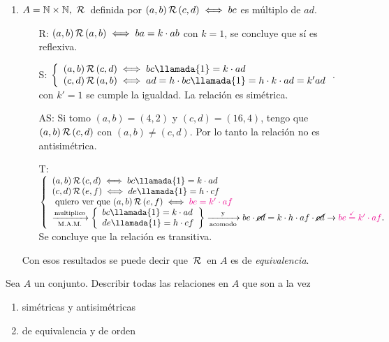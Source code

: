 \documentclass[12pt,a4paper, spanish]{article}
\begin{document}
\begin{enumerate}[label=\roman*)]
	\item $A = \mathbb N \times \mathbb N,\, \,\mathcal{R}\,$ definida por $(a,b) \,\mathcal{R}\, (c,d) \iff bc$ es múltiplo de $ad$.
	      \begin{enumerate}
		      \item[R:] $(a,b) \,\mathcal{R}\, (a,b) \iff ba = k\cdot ab$ con $k=1$, se concluye que sí es reflexiva.
		      \item[S:]
		            $ \llave{l}{
				            (a,b) \relacion (c,d) \sisolosi bc \llamada{1}= k\cdot ad \\
				            (c,d) \relacion (a,b) \sisolosi ad = h\cdot bc \llamada{1}= h\cdot k \cdot ad = k'ad
			            }$.\\
		            con  $k'=1$ se cumple la igualdad. La relación es simétrica.
		      \item[AS:] Si tomo $(a, b) = (4, 2)$ y $(c,d) = (16, 4)$, tengo que $(a,b) \,\mathcal{R}\, (c,d)$ con $(a,b) \neq (c,d)$. Por lo tanto
		            la relación no es antisimétrica.
		      \item[T:]$
			            \llave{l}{
				            (a,b) \relacion (c,d) \sisolosi bc \llamada{1}= k\cdot ad \\
				            (c,d) \relacion (e,f) \sisolosi de \llamada{1}= h\cdot cf \\
				            \qvq (a,b) \relacion (e,f) \sisolosi \magenta{$be = k'\cdot af$}\\
				            \flecha{multiplico}[M.A.M.]
				            \llaves{l}
				            {
					            bc \llamada{1}= k\cdot ad \\
					            de \llamada{1}= h\cdot cf \\
				            } \flecha{y}[acomodo] be \cdot \cancel{cd} = k \cdot h \cdot af \cdot \cancel{cd} \to \magenta{$be \stackrel{\checkmark}= k' \cdot af$}.
			            }$\\
		            Se concluye que la relación es transitiva.
	      \end{enumerate}
	      Con esos resultados se puede decir que $\,\mathcal{R}\,$ en $A$ es de \textit{equivalencia}.

\end{enumerate}
\ejercicio
Sea $A$ un conjunto. Describir todas las relaciones en $A$ que son a la vez
\begin{multicols}{2}
	\begin{enumerate}[label=\roman*)]
		\item simétricas y antisimétricas\\ 
		\item de equivalencia y de orden\\ 
	\end{enumerate}
\end{multicols}
\end{document}
